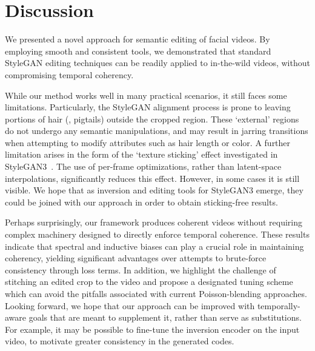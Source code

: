 \section{Discussion}

We presented a novel approach for semantic editing of facial videos. %
By employing smooth and consistent tools, we demonstrated that standard StyleGAN editing techniques can be readily applied to in-the-wild videos, without compromising temporal coherency.

While our method works well in many practical scenarios, it still faces some limitations.
Particularly, the StyleGAN alignment process is prone to leaving portions of hair (\eg, pigtails) outside the cropped region. These `external' regions do not undergo any semantic manipulations, and may result in jarring transitions when attempting to modify attributes such as hair length or color. 
A further limitation arises in the form of the `texture sticking' effect investigated in StyleGAN3~\cite{aliasfreeKarras2021}. The use of per-frame optimizations, rather than latent-space interpolations, significantly reduces this effect. However, in some cases it is still visible. We hope that as inversion and editing tools for StyleGAN3 emerge, they could be joined with our approach in order to obtain sticking-free results.

Perhaps surprisingly, our framework produces coherent videos without requiring complex machinery designed to directly enforce temporal coherence.
These results indicate that spectral and inductive biases can play a crucial role in maintaining coherency, yielding significant advantages over attempts to brute-force consistency through loss terms.
In addition, we highlight the challenge of stitching an edited crop to the video and propose a designated tuning scheme which can avoid the pitfalls associated with current Poisson-blending approaches.
Looking forward, we hope that our approach can be improved with temporally-aware goals that are meant to supplement it, rather than serve as substitutions. For example, it may be possible to fine-tune the inversion encoder on the input video, to motivate greater consistency in the generated codes. 
